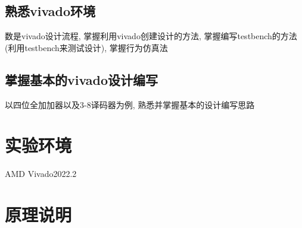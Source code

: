 \documentclass[fontset=windows,12pt]{article}
\begin{document}
    \subsection{熟悉vivado环境}
    数是vivado设计流程, 掌握利用vivado创建设计的方法, 掌握编写testbench的方法(利用testbench来测试设计), 掌握行为仿真法
    \subsection{掌握基本的vivado设计编写}
    以四位全加加器以及3-8译码器为例, 熟悉并掌握基本的设计编写思路

\section{实验环境}
    AMD Vivado2022.2

\section{原理说明}
\end{document}
